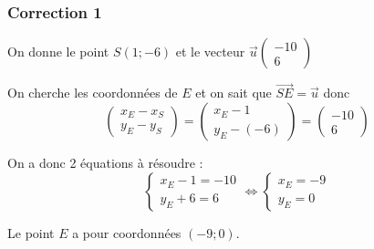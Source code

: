 \documentclass[15pt, mathserif]{beamer}
\begin{document}
\begin{frame}
\vspace{-10mm}
	\frametitle{Correction 1}
\vspace*{0.5cm} 
 On donne le point $S(1;-6)$ et le vecteur $\vec{u}\begin{pmatrix} -10\\ 6 \end{pmatrix}$ 
 
 On cherche les coordonnées de $E$ et on sait que $\vec{SE}=\vec{u}$ donc $$\begin{pmatrix} x_{E}-x_S \\ y_{E}-y_S \end{pmatrix}=\begin{pmatrix} x_{E}-1 \\ y_{E}-\left(-6\right)\end{pmatrix}=\begin{pmatrix} -10 \\ 6 \end{pmatrix}$$ 
 
 On a donc 2 équations à résoudre :  
 $$ \left\{ \begin{array}{cc} 
  x_{E}-1=-10 \\ 
  y_{E}+6=6 
 \end{array} \right. \Leftrightarrow \left\{ \begin{array}{cc} 
  x_{E}=-9 \\ 
 y_{E}=0 
 \end{array} \right. $$ 
 
 Le point $E$ a pour coordonnées $(-9;0)$.\end{frame}
\end{document}

